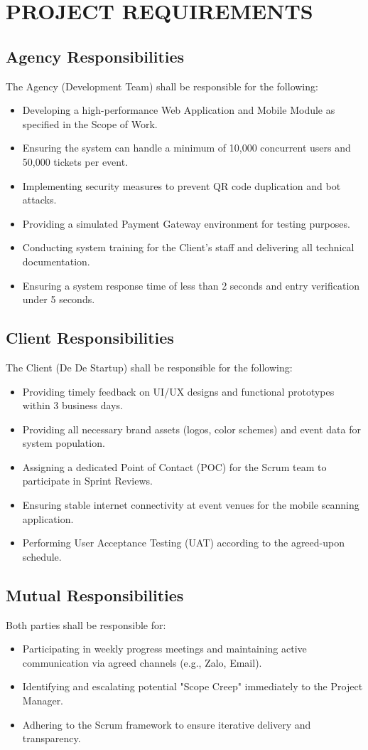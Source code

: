 \chapter{PROJECT REQUIREMENTS}

\section{Agency Responsibilities}
The Agency (Development Team) shall be responsible for the following:
\begin{itemize}
    \item Developing a high-performance Web Application and Mobile Module as specified in the Scope of Work.
    \item Ensuring the system can handle a minimum of 10,000 concurrent users and 50,000 tickets per event.
    \item Implementing security measures to prevent QR code duplication and bot attacks.
    \item Providing a simulated Payment Gateway environment for testing purposes.
    \item Conducting system training for the Client’s staff and delivering all technical documentation.
    \item Ensuring a system response time of less than 2 seconds and entry verification under 5 seconds.
\end{itemize}

\section{Client Responsibilities}
The Client (De De Startup) shall be responsible for the following:
\begin{itemize}
    \item Providing timely feedback on UI/UX designs and functional prototypes within 3 business days.
    \item Providing all necessary brand assets (logos, color schemes) and event data for system population.
    \item Assigning a dedicated Point of Contact (POC) for the Scrum team to participate in Sprint Reviews.
    \item Ensuring stable internet connectivity at event venues for the mobile scanning application.
    \item Performing User Acceptance Testing (UAT) according to the agreed-upon schedule.
\end{itemize}

\section{Mutual Responsibilities}
Both parties shall be responsible for:
\begin{itemize}
    \item Participating in weekly progress meetings and maintaining active communication via agreed channels (e.g., Zalo, Email).
    \item Identifying and escalating potential "Scope Creep" immediately to the Project Manager.
    \item Adhering to the Scrum framework to ensure iterative delivery and transparency.
\end{itemize}